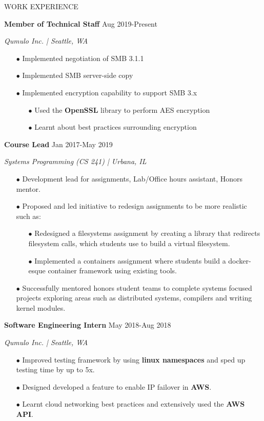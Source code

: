 \documentclass[paper=a4,fontsize=10pt]{scrartcl} %
\newcommand{\NewPart}[1]{ \noindent \large \usefont{OT1}{phv}{b}{n}\uppercase{#1} \normalfont \normalsize}
\newcommand{\EducationEntry}[4]{
		\noindent \textbf{#1}     %
			\hfill#2 \par  %
		\noindent \textit{#3} \par        %
		\noindent\hangafter=0 \small #4 %
		\normalsize \par}
\begin{document}
\begin{minipage}[t]{0.75\textwidth}

\NewPart{Work experience}{}

\EducationEntry{Member of Technical Staff}{Aug 2019-Present}{Qumulo Inc. | Seattle, WA}{
\begin{itemize}
  \item[$\bullet$] Implemented negotiation of SMB 3.1.1
  \item[$\bullet$] Implemented SMB server-side copy
  \item[$\bullet$] Implemented encryption capability to support SMB 3.x
    \begin{itemize}
      \item[$\bullet$] Used the \textbf{OpenSSL} library to perform AES encryption
      \item[$\bullet$] Learnt about best practices surrounding encryption
    \end{itemize}
\end{itemize}
}

\EducationEntry{Course Lead}{Jan 2017-May 2019}{Systems Programming (CS 241) | Urbana, IL}{
\begin{itemize}
  \item[$\bullet$] Development lead for assignments, Lab/Office hours assistant, Honors mentor.
  \item[$\bullet$] Proposed and led initiative to redesign assignments to be more realistic such as:
    \begin{itemize}
      \item[$\bullet$] Redesigned a filesystems assignment by creating a library that redirects filesystem calls, which students use to build a virtual filesystem.
      \item[$\bullet$] Implemented a containers assignment where students build a docker-esque container framework using existing tools.
    \end{itemize}
  \item[$\bullet$] Successfully mentored honors student teams to complete systems focused projects exploring areas such as distributed systems, compilers and writing kernel modules.
\end{itemize}
}
\EducationEntry{Software Engineering Intern}{May 2018-Aug 2018}{Qumulo Inc. | Seattle, WA}{
\begin{itemize}
  \item[$\bullet$] Improved testing framework by using \textbf{linux namespaces} and sped up testing time by up to 5x.
  \item[$\bullet$] Designed developed a feature to enable IP failover in \textbf{AWS}.
  \item[$\bullet$] Learnt cloud networking best practices and extensively used the \textbf{AWS API}.
\end{itemize}
}


\end{minipage}
\end{document}
